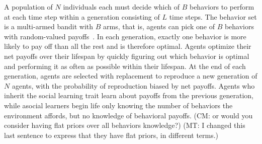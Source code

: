 \documentclass[letterpaper,11.5pt]{scrartcl}
\newcommand{\mt}[1]{{\textcolor{myorange} {({\tiny MT:} #1)}}}
\newcommand{\cm}[1]{{\textcolor{mypurple} {({\tiny CM:} #1)}}}
\newcommand{\ps}[1]{{\textcolor{mygreen} {({\tiny PS:} #1)}}}
\begin{document}
A population of $N$ individuals each must decide which of $B$ behaviors to perform at
each time step within a generation consisting of $L$ time steps. The behavior set is a multi-armed bandit with $B$ arms, that is, agents can pick one of $B$ behaviors with random-valued payoffs~\cite{SuttonBartoBook,McElreath2005,Steyvers2009,Rendell2010,Schulz2019}.  
In each generation, exactly one behavior is more likely to pay off than all the rest and is therefore optimal. Agents
optimize their net payoffs over their lifespan by quickly figuring out which
behavior is optimal and performing it as often as possible within their lifespan.
At the end of each
generation, agents are selected with replacement to reproduce a new generation of $N$ agents,
with the probability of reproduction biased by net payoffs. Agents who inherit the social
learning trait learn about payoffs from the previous generation, while asocial learners begin
life only knowing the number of behaviors the environment affords, but no knowledge
of behavioral payoffs.
\cm{or would you consider having flat priors over all behaviors knowledge?} 
\mt{I changed this last sentence to express that they have flat priors, in different
terms.}

\end{document}
